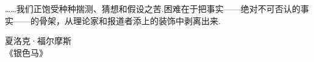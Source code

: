 \begin{flushright}
\begin{minipage}{.90\textwidth}
……我们正饱受种种揣测、猜想和假设之苦.困难在于把事实——绝对不可否认的事实——的骨架，从理论家和报道者添上的装饰中剥离出来.
\begin{flushright}夏洛克·福尔摩斯\\《银色马》\end{flushright}
\end{minipage}
\end{flushright}
